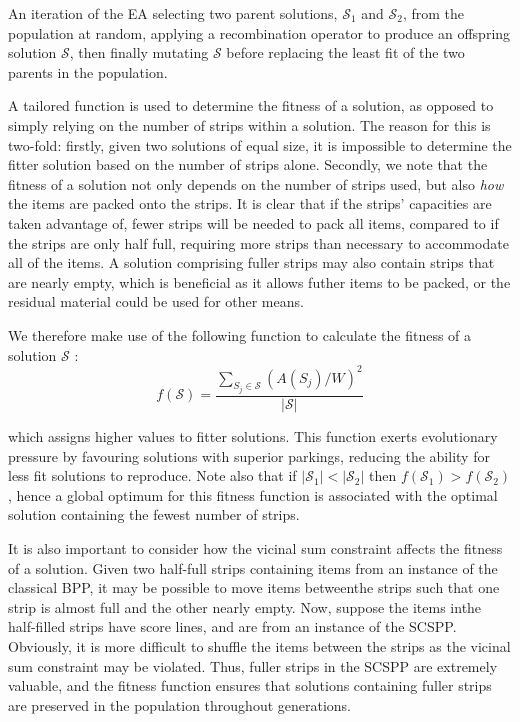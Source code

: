 \documentclass{elsarticle}
\begin{document}
An iteration of the EA  selecting two parent solutions, $\mathcal{S}_1$ and $\mathcal{S}_2$, from the population at random, applying a recombination operator to produce an offspring solution $\mathcal{S}$, then finally mutating $\mathcal{S}$ before replacing the least fit of the two parents in the population.

A tailored function is used to determine the fitness of a solution, as opposed to simply relying on the number of strips within a solution. The reason for this is two-fold: firstly, given two solutions of equal size, it is impossible to determine the fitter solution based on the number of strips alone. Secondly, we note that the fitness of a solution not only depends on the number of strips used, but also \emph{how} the items are packed onto the strips. It is clear that if the strips' capacities are taken advantage of, fewer strips will be needed to pack all items, compared to if the strips are only half full, requiring more strips than necessary to accommodate all of the items. A solution comprising fuller strips may also contain strips that are nearly empty, which is beneficial as it allows futher items to be packed, or the residual material could be used for other means. 

We therefore make use of the following function to calculate the fitness of a solution $\mathcal{S}$ \cite{falkenauer1992}:
\begin{equation}
	f(\mathcal{S}) = \frac{\sum_{S_j \in \mathcal{S}} (A(S_j)/W)^2}{|\mathcal{S}|}
\end{equation}

\noindent which assigns higher values to fitter solutions. This function exerts evolutionary pressure by favouring solutions with superior parkings, reducing the ability for less fit solutions to reproduce. Note also that if $|\mathcal{S}_1| < |\mathcal{S}_2|$  then $f(\mathcal{S}_1) > f(\mathcal{S}_2)$, hence a global optimum for this fitness function is associated with the optimal solution containing the fewest number of strips.

It is also important to consider how the vicinal sum constraint affects the fitness of a solution. Given two half-full strips containing items from an instance of the classical BPP, it may be possible to move items betweenthe strips such that one strip is almost full and the other nearly empty. Now, suppose the items inthe half-filled strips have score lines, and are from an instance of the SCSPP. Obviously, it is more difficult to shuffle the items between the strips as the vicinal sum constraint may be violated. Thus, fuller strips in the SCSPP are extremely valuable, and the fitness function ensures that solutions containing fuller strips are preserved in the population throughout generations.
\end{document}
